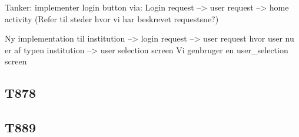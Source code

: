 Tanker:
implementer login button via:
Login request --> user request --> home activity
(Refer til steder hvor vi har beskrevet requestsne?)

Ny implementation til institution --> login request --> user request hvor user nu er af typen institution --> user selection screen
Vi genbruger en user_selection screen

\subsection{T878}

\subsection{T889}



